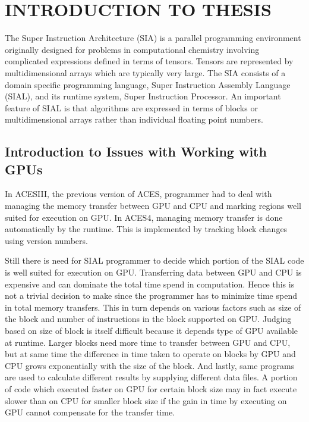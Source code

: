 \chapter{INTRODUCTION TO THESIS} \label{intro}
The Super Instruction Architecture (SIA) is a parallel programming environment
originally designed for problems in computational chemistry involving complicated
expressions defined in terms of tensors. Tensors are represented by
multidimensional arrays which are typically very large. The SIA consists of a
domain specific programming language, Super Instruction Assembly Language
(SIAL), and its runtime system, Super Instruction Processor. An important
feature of SIAL is that algorithms are expressed in terms of blocks or
multidimensional arrays rather than individual floating point numbers.

\section{Introduction to Issues with Working with GPUs}
In ACESIII, the previous version of ACES, programmer had to deal with managing
the memory transfer between GPU and CPU and marking regions well suited for execution
on GPU. In ACES4, managing memory transfer is done automatically by the runtime.
This is implemented by tracking block changes using version numbers.

Still there is need for SIAL programmer to decide which portion of the SIAL code
is well suited for execution on GPU. Transferring data between GPU and CPU is
expensive and can dominate the total time spend in computation. Hence this is not
a trivial decision to make since the programmer has to minimize time spend in
total memory transfers. This in turn depends on various factors such as
size of the block and number of instructions in the block supported on GPU. Judging
based on size of block is itself difficult because it depends type of GPU available
at runtime. Larger blocks need more time to transfer between GPU and CPU, but at
same time the difference in time taken to operate on blocks by GPU and CPU grows
exponentially with the size of the block. And lastly, same programs are used to
calculate different results by supplying different data files. A portion of code
which executed faster on GPU for certain block size may in fact execute slower
than on CPU for smaller block size if the gain in time by executing on GPU cannot
compensate for the transfer time.

